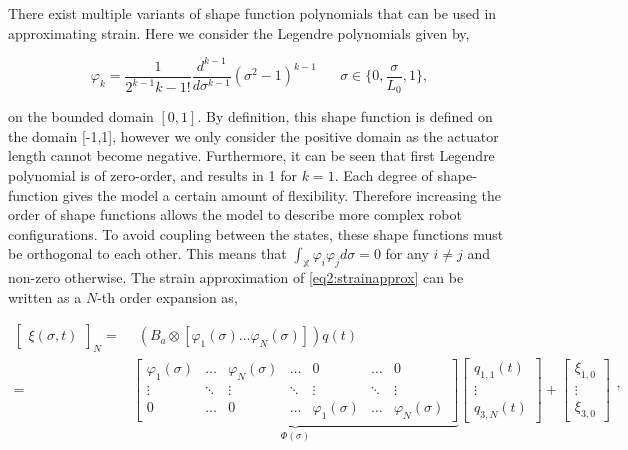 There exist multiple variants of shape function polynomials that can be used in approximating strain. Here we consider the Legendre polynomials given by,

\begin{equation}
    \varphi_{k} = \frac{1}{2^{k-1} k-1!} \frac{d^{k-1}}{d\sigma^{k-1}}(\sigma^2-1)^{k-1} \hspace{20pt} \sigma \in \Big\{0,\frac{\sigma}{L_0},1\Big\},
    \label{eq2:shapefunction}
\end{equation}

on the bounded domain $[0,1]$. By definition, this shape function is defined on the domain [-1,1], however we only consider the positive domain as the actuator length cannot become negative. Furthermore, it can be seen that first Legendre polynomial is of zero-order, and results in 1 for $k=1$. Each degree of shape-function gives the model a certain amount of flexibility. Therefore increasing the order of shape functions allows the model to describe more complex robot configurations. To avoid coupling between the states, these shape functions must be orthogonal to each other. This means that $\int_\mathbb{X} \varphi_i \varphi_j d \sigma = 0$ for any $i \neq j$ and non-zero otherwise. The strain approximation of \ref{eq2:strainapprox} can be written as a $N$-th order expansion as,



\begin{equation}
\begin{aligned}
    \begin{bmatrix}\xi(\sigma,t)\end{bmatrix}_N = & \hspace{5pt}  (B_a \otimes [ \varphi_1(\sigma) \dots \varphi_N(\sigma) ])q(t)\\ = &  \underbrace{ \begin{bmatrix}
    \varphi_1(\sigma) & \dots  & \varphi_N(\sigma) & \dots     & 0      & \dots  &  0 \\
    \vdots    & \ddots & \vdots    & \ddots    & \vdots & \ddots & \vdots \\
    0         & \dots  & 0         & \dots     & \varphi_1(\sigma) & \dots & \varphi_N (\sigma)
    \end{bmatrix}}_{\Phi(\sigma)} \begin{bmatrix} q_{1,1}(t) \\ \vdots \\ q_{3,N}(t) \end{bmatrix} +  \begin{bmatrix} \xi_{1,0} \\ \vdots \\ \xi_{3,0}   \end{bmatrix}
    \end{aligned},
\label{eq2:xishape}
\end{equation}

